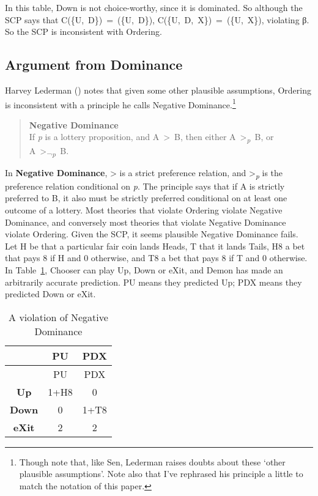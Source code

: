 \documentclass[
  11pt,
  letterpaper,
  DIV=11,
  numbers=noendperiod,
  twoside]{scrartcl}
\begin{document}
In this table, Down is not choice-worthy, since it is dominated. So
although the SCP says that C(\{U,~D\})~=~(\{U,~D\}),
C(\{U,~D,~X\})~=~(\{U,~X\}), violating β. So the SCP is inconsistent
with Ordering.

\subsection{Argument from Dominance}\label{sec-negdom}

Harvey Lederman () notes that given some
other plausible assumptions, Ordering is inconsistent with a principle
he calls Negative Dominance.\footnote{Though note that, like Sen,
  Lederman raises doubts about these `other plausible assumptions'. Note
  also that I've rephrased his principle a little to match the notation
  of this paper.}

\begin{quote}
\textbf{Negative Dominance}\\
If \emph{p} is a lottery proposition, and A~\textgreater~B, then either
A~\textgreater{}\textsubscript{\emph{p}}~B, or
A~\textgreater{}\textsubscript{¬\emph{p}}~B.
\end{quote}

In \textbf{Negative Dominance}, \textgreater{} is a strict preference
relation, and \textgreater{}\textsubscript{\emph{p}} is the preference
relation conditional on \emph{p}. The principle says that if A is
strictly preferred to B, it also must be strictly preferred conditional
on at least one outcome of a lottery. Most theories that violate
Ordering violate Negative Dominance, and conversely most theories that
violate Negative Dominance violate Ordering. Given the SCP, it seems
plausible Negative Dominance fails. Let H be that a particular fair coin
lands Heads, T that it lands Tails, H8 a bet that pays 8 if H and 0
otherwise, and T8 a bet that pays 8 if T and 0 otherwise. In
Table~\ref{tbl-negdom}, Chooser can play Up, Down or eXit, and Demon has
made an arbitrarily accurate prediction. PU means they predicted Up; PDX
means they predicted Down or eXit.

\begin{longtable}[]{@{}ccc@{}}
\caption{A violation of Negative
Dominance}\label{tbl-negdom}\tabularnewline
\toprule\noalign{}
& PU & PDX \\
\midrule\noalign{}
\endfirsthead
\toprule\noalign{}
& PU & PDX \\
\midrule\noalign{}
\endhead
\bottomrule\noalign{}
\endlastfoot
\textbf{Up} & 1+H8 & 0 \\
\textbf{Down} & 0 & 1+T8 \\
\textbf{eXit} & 2 & 2 \\
\end{longtable}
\end{document}
